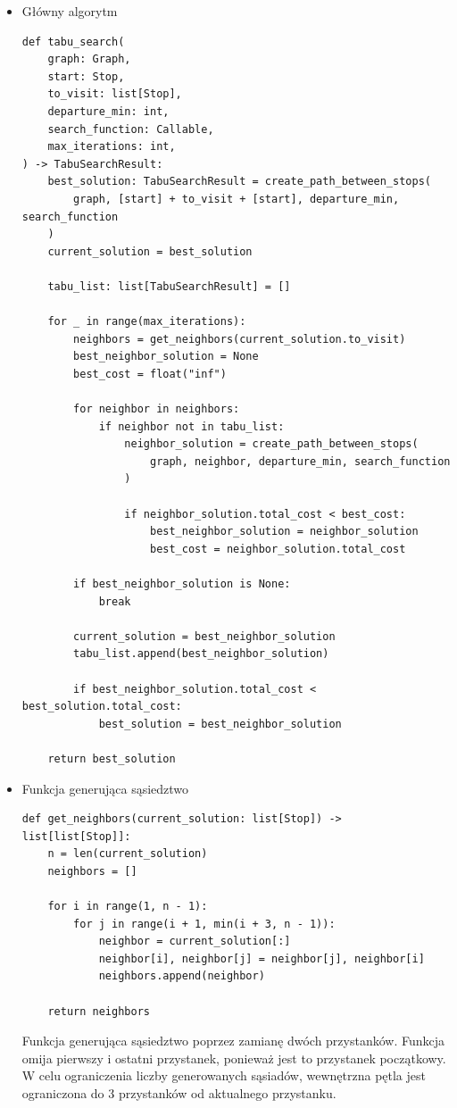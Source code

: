 \documentclass[a4paper, 12pt]{article}
\begin{document}
\begin{itemize}
    \item Główny algorytm
\begin{lstlisting}
def tabu_search(
    graph: Graph,
    start: Stop,
    to_visit: list[Stop],
    departure_min: int,
    search_function: Callable,
    max_iterations: int,
) -> TabuSearchResult:
    best_solution: TabuSearchResult = create_path_between_stops(
        graph, [start] + to_visit + [start], departure_min, search_function
    )
    current_solution = best_solution

    tabu_list: list[TabuSearchResult] = []

    for _ in range(max_iterations):
        neighbors = get_neighbors(current_solution.to_visit)
        best_neighbor_solution = None
        best_cost = float("inf")

        for neighbor in neighbors:
            if neighbor not in tabu_list:
                neighbor_solution = create_path_between_stops(
                    graph, neighbor, departure_min, search_function
                )

                if neighbor_solution.total_cost < best_cost:
                    best_neighbor_solution = neighbor_solution
                    best_cost = neighbor_solution.total_cost

        if best_neighbor_solution is None:
            break

        current_solution = best_neighbor_solution
        tabu_list.append(best_neighbor_solution)

        if best_neighbor_solution.total_cost < best_solution.total_cost:
            best_solution = best_neighbor_solution

    return best_solution
\end{lstlisting}

    \item Funkcja generująca sąsiedztwo
\begin{lstlisting}
def get_neighbors(current_solution: list[Stop]) -> list[list[Stop]]:
    n = len(current_solution)
    neighbors = []

    for i in range(1, n - 1):
        for j in range(i + 1, min(i + 3, n - 1)):
            neighbor = current_solution[:]
            neighbor[i], neighbor[j] = neighbor[j], neighbor[i]
            neighbors.append(neighbor)

    return neighbors
\end{lstlisting}
    Funkcja generująca sąsiedztwo poprzez zamianę dwóch przystanków.
    Funkcja omija pierwszy i ostatni przystanek, ponieważ jest to przystanek początkowy.
    W celu ograniczenia liczby generowanych sąsiadów, wewnętrzna pętla jest ograniczona
    do 3 przystanków od aktualnego przystanku.


\end{itemize}
\end{document}
